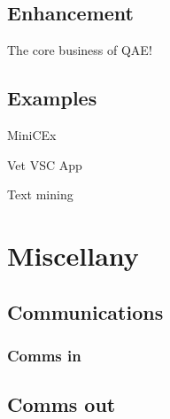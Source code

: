 \documentclass[
  letterpaper,
  DIV=11,
  numbers=noendperiod]{scrreprt}
\begin{document}
\hypertarget{enhancement}{%
\chapter{Enhancement}\label{enhancement}}

The core business of QAE!

\hypertarget{examples}{%
\chapter{Examples}\label{examples}}

MiniCEx

Vet VSC App

Text mining

\part{Miscellany}

\hypertarget{communications}{%
\chapter{Communications}\label{communications}}

\hypertarget{comms-in}{%
\section{Comms in}\label{comms-in}}

\hypertarget{comms-out}{%
\chapter{Comms out}\label{comms-out}}
\end{document}
